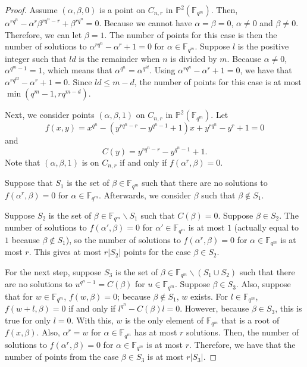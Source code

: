 \documentclass[12pt,letterpaper]{amsart}
\theoremstyle{definition}
\begin{document}
\begin{proof}
Assume $(\alpha,\beta,0)$ is a point on $C_{n,r}$ in $\mathbb{P}^2(\mathbb{F}_{q^m})$. Then, $\alpha^{rq^n}-\alpha^r\beta^{rq^n-r}+\beta^{rq^n}=0$. Because we cannot have $\alpha=\beta=0$, $\alpha\not=0$ and $\beta\not=0$. Therefore, we can let $\beta=1$. The number of points for this case is then the number of solutions to $\alpha^{rq^n}-\alpha^r+1=0$ for $\alpha\in\mathbb{F}_{q^m}$. Suppose $l$ is the positive integer such that $ld$ is the remainder when $n$ is divided by $m$. Because $\alpha\not=0$, $\alpha^{q^m-1}=1$, which means that $\alpha^{q^n}=\alpha^{q^{ld}}$. Using $\alpha^{rq^n}-\alpha^r+1=0$, we have that $\alpha^{rq^{ld}}-\alpha^r+1=0$. Since $ld\leq m-d$, the number of points for this case is at most $\min(q^m-1, rq^{m-d})$.

Next, we consider points $(\alpha,\beta,1)$ on $C_{n,r}$ in $\mathbb{P}^2(\mathbb{F}_{q^m})$. Let
\[
f(x, y)=x^{q^n}-(y^{rq^n-r}-y^{q^n-1}+1)x+y^{rq^n}-y^r+1=0
\]
and 
\[
C(y)=y^{rq^n-r}-y^{q^n-1}+1.
\]
Note that $(\alpha,\beta,1)$ is on $C_{n,r}$ if and only if $f(\alpha^r,\beta)=0$.

Suppose that $S_1$ is the set of $\beta\in\mathbb{F}_{q^m}$ such that there are no solutions to $f(\alpha^r,\beta)=0$ for $\alpha\in\mathbb{F}_{q^m}$. Afterwards, we consider $\beta$ such that $\beta\notin S_1$.

Suppose $S_2$ is the set of $\beta\in\mathbb{F}_{q^m}\backslash S_1$ such that $C(\beta)=0$. Suppose $\beta\in S_2$. The number of solutions to $f(\alpha',\beta)=0$ for $\alpha'\in\mathbb{F}_{q^m}$ is at most $1$ (actually equal to $1$ because $\beta\notin S_1$), so the number of solutions to $f(\alpha^r, \beta)=0$ for $\alpha\in\mathbb{F}_{q^m}$ is at most $r$. This gives at most $r|S_2|$ points for the case $\beta\in S_2$.

For the next step, suppose $S_3$ is the set of $\beta\in\mathbb{F}_{q^m}\backslash (S_1\cup S_2)$ such that there are no solutions to $u^{q^n-1}=C(\beta)$ for $u\in \mathbb{F}_{q^m}$. Suppose $\beta\in S_3$. Also, suppose that for $w\in\mathbb{F}_{q^m}$, $f(w,\beta)=0$; because $\beta\notin S_1$, $w$ exists. For $l\in\mathbb{F}_{q^m}$, $f(w+l,\beta)=0$ if and only if $l^{q^n}-C(\beta)l=0$. However, because $\beta\in S_3$, this is true for only $l=0$. With this, $w$ is the only element of $\mathbb{F}_{q^m}$ that is a root of $f(x,\beta)$. Also, $\alpha^r=w$ for $\alpha\in\mathbb{F}_{q^m}$ has at most $r$ solutions. Then, the number of solutions to $f(\alpha^r,\beta)=0$ for $\alpha\in\mathbb{F}_{q^m}$ is at most $r$. Therefore, we have that the number of points from the case $\beta\in S_3$ is at most $r|S_3|$.


\end{proof}
\end{document}
